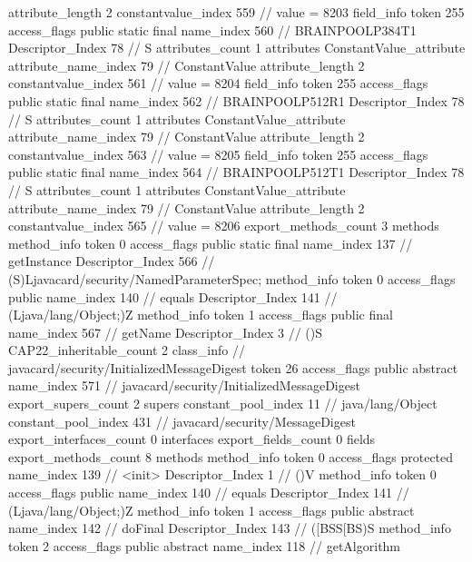 {{{{{{{					attribute_length	2
					constantvalue_index	559		// value = 8203
				}
				}
			}
			field_info {
				token	255
				access_flags	public static final
				name_index	560		// BRAINPOOLP384T1
				Descriptor_Index	78		// S
				attributes_count	1
				attributes {
				ConstantValue_attribute {
					attribute_name_index	79		// ConstantValue
					attribute_length	2
					constantvalue_index	561		// value = 8204
				}
				}
			}
			field_info {
				token	255
				access_flags	public static final
				name_index	562		// BRAINPOOLP512R1
				Descriptor_Index	78		// S
				attributes_count	1
				attributes {
				ConstantValue_attribute {
					attribute_name_index	79		// ConstantValue
					attribute_length	2
					constantvalue_index	563		// value = 8205
				}
				}
			}
			field_info {
				token	255
				access_flags	public static final
				name_index	564		// BRAINPOOLP512T1
				Descriptor_Index	78		// S
				attributes_count	1
				attributes {
				ConstantValue_attribute {
					attribute_name_index	79		// ConstantValue
					attribute_length	2
					constantvalue_index	565		// value = 8206
				}
				}
			}
			}
			export_methods_count	3
			methods {
				method_info {
					token	0
					access_flags	public static final
					name_index	137		// getInstance
					Descriptor_Index	566		// (S)Ljavacard/security/NamedParameterSpec;
				}
				method_info {
					token	0
					access_flags	public
					name_index	140		// equals
					Descriptor_Index	141		// (Ljava/lang/Object;)Z
				}
				method_info {
					token	1
					access_flags	public final
					name_index	567		// getName
					Descriptor_Index	3		// ()S
				}
			}
			CAP22_inheritable_count	2
		}
		class_info {		// javacard/security/InitializedMessageDigest
			token	26
			access_flags	public abstract
			name_index	571		// javacard/security/InitializedMessageDigest
			export_supers_count	2
			supers {
				constant_pool_index	11		// java/lang/Object
				constant_pool_index	431		// javacard/security/MessageDigest
			}
			export_interfaces_count	0
			interfaces {
			}
			export_fields_count	0
			fields {
			}
			export_methods_count	8
			methods {
				method_info {
					token	0
					access_flags	protected
					name_index	139		// <init>
					Descriptor_Index	1		// ()V
				}
				method_info {
					token	0
					access_flags	public
					name_index	140		// equals
					Descriptor_Index	141		// (Ljava/lang/Object;)Z
				}
				method_info {
					token	1
					access_flags	public abstract
					name_index	142		// doFinal
					Descriptor_Index	143		// ([BSS[BS)S
				}
				method_info {
					token	2
					access_flags	public abstract
					name_index	118		// getAlgorithm
}}}}}
